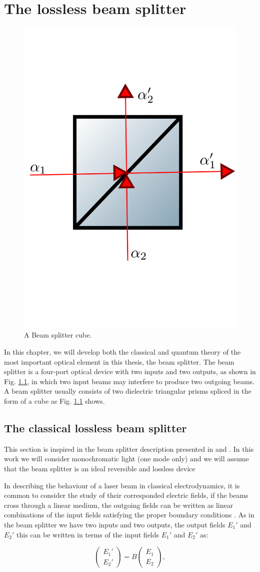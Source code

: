 \documentclass{book}
\begin{document}
\chapter{The lossless beam splitter}

\begin{figure}[h!]
\centering
\includegraphics[width=5 cm,height=5 cm]{images/bS.png}
\caption{A Beam splitter cube.}
\label{fig:BS}
\end{figure}

In this chapter, we will develop both the classical and quantum theory of the most important optical element in this thesis, the beam splitter. The beam splitter is a four-port optical device with two inputs and two outputs, as shown in Fig. \ref{fig:BS}, in which two input beams may interfere to produce two outgoing beams. A beam splitter usually consists of two dielectric triangular prisms spliced in the form of a cube as Fig. \ref{fig:BS} shows.

\section{The  classical lossless beam splitter}

This section is inspired in the beam splitter description presented in \cite{ludon} and \cite{leonhardt}. In this work we will consider monochromatic light (one mode only) and we will assume that the beam splitter is an ideal reversible and lossless device


In describing the behaviour of a laser beam in classical electrodynamics, it is common to consider the study of their corresponded electric fields, if the beams cross through a linear medium, the outgoing fields can be written as linear combinations of the input fields satisfying the proper boundary conditions \cite{jackson}. As in the beam splitter we have two inputs and two outputs, the output fields $E_{1}'$ and $E_{2}'$ this can be written in terms of the input fields $E_{1}'$ and $E_{2}'$ as:

\begin{equation}
\begin{pmatrix} E_{1}' \\ E_{2}' \end{pmatrix}=B\begin{pmatrix} E_{1} \\ E_{2} \end{pmatrix},
\end{equation}
\end{document}
